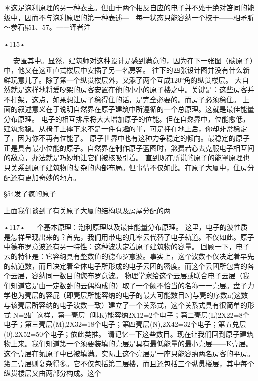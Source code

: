 ＊这足泡利原理的另一种衣主。但由于两个相反自应的电子并不处于绝对笘同的能级中，因而不与泡利原理的第一种表述—－每一状态只能容纳一个校于——相矛肵～参石§51、57。一一译者注

•115•
  







  
安匿其中。显然，建筑师对这种设计是感到满意的，因为在下一张图（碳原子）中，他又在这垂直式楼层中安插了另一名房客。
往下的四张设计图并没有什么新鲜玩意儿了。除了第一个纵贯楼层外，又添了两个互成120°角的纵贯楼层。
大自然就是这样地将爱吵架的房客安置在他的小小的原子楼之中。关键是：这些房客并不打架，这点，如果想让房子稳得住的话，是完全必要的。而房子必须稳住。
上面的叙述意义在于说明自然界在原子建筑中所遵循的一个总原理。这就是最佳能量分布原理。
电子的相互排斥将大大增加原子的位能。但在自然界中，位能愈低，建筑愈稳。从椅子上摔下来不是一件有趣的半，可是拌在地上后，你却非常稳定了，因为你不再有位能了。
原子世界中也有这种力争稳定的倾向。最稳定的原子正是具有最小位能的原子。自然界在制作原子蓝图时，煞费若心去克服电子相互间的敌意，办法就是巧妙地让它们被核吸引着。
直到现在所说的原子的能罩原理也只关系到原子建筑物的复杂的内部布局。但事情不仅如此。在原子大厦中，住房分配还有更加奇妙的地方。

§54发了疯的原子

上面我们谈到了有关原子大厦的结构以及房屋分配的两

•117•
  
个基本原理：泡利原理以及最佳能量分布原理。
这里，电子的波性质是怎祥呈现出来的？首先，我们用带电的几率云代替了电子轨道。不仅如此。原子中德布罗意波还有另一特性：这种波决定着原子建筑物的容量。
回顾一下，电子云的特征是：它容纳具有整数值的德布罗意波。事实上，这个波数不仅决定着早先的轨道数，而且决定着全体电子所形成的电子云团的密度。而这个云团所包含的各个云层，容纳同一数目的您布罗意波。
物理学家给这个云层或联合电子云层（我们知道它是由一定数卧的云偶构成的）取了一个颇不恰当的名称一一壳层。盘子力学也为壳层的容屁（即壳层所能容纳的电子的最大可能数目N)与壳的序数n(这数与该壳层所容纳的电子波数一致）建立了一个关系式，这个关系式具有很简单的形式
N=2矿
这样，第一壳层（叫K)能容纳2X12=2个电子；第二壳层(L)2X22=8个电子；第三壳层(M),2X32=18个电子；第四壳层(N),2X42=32个电子；第五兑层(0),2X52=50个电子；依此类推。
请记忆一下这些数目。现在让我们回到原子建筑物上来。我们知道第一个须要装填的壳层是具有最低能量的最小壳层——K壳层。这个壳层在氮原子中已被填满。实际上这个亮层是一座只能容纳两名房客的平房。
笫二壳层则复杂得多。它不仅包括第二层楼，而且还包栝三个纵贯楼层，其中每个纵贯楼层又由两部分构成。这个

